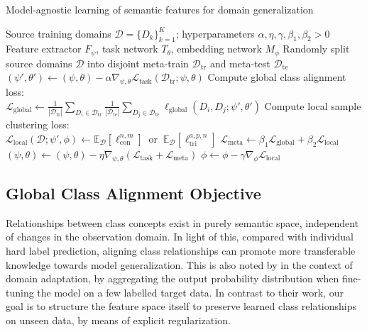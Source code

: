 \documentclass{article}
\newcommand{\Domains}{\mathcal{D}}
\newcommand{\TrainDomains}{\Domains_\mathrm{tr}}
\newcommand{\TestDomains}{\Domains_\mathrm{te}}
\newcommand{\TaskLoss}{\mathcal{L}_\mathrm{task}}
\newcommand{\LabelLoss}{\mathcal{L}_\mathrm{global}}
\newcommand{\LabelLossPair}{\ell_\mathrm{global}}
\newcommand{\MetricLoss}{\mathcal{L}_\mathrm{local}}
\newcommand{\MetaLoss}{\mathcal{L}_\mathrm{meta}}
\newcommand{\grad}[1][]{\nabla_{\!#1}}
\newcommand{\expec}{\mathbb{E}}
\begin{document}
\begin{algorithm}[t]
\caption{Model-agnostic learning of semantic features for domain generalization}
\begin{algorithmic}[1]
    \REQUIRE Source training domains $\Domains=\{D_k\}_{k=1}^K$; hyperparameters $\alpha, \eta, \gamma, \beta_1, \beta_2 > 0$
    \ENSURE Feature extractor $F_\psi$, task network $T_\theta$, embedding network $M_\phi$
    \REPEAT
        \STATE Randomly split source domains $\Domains$ into disjoint meta-train $\TrainDomains$ and meta-test $\TestDomains$
        \STATE $(\psi',\theta') \gets (\psi,\theta) - \alpha \grad[\psi,\theta] \TaskLoss(\TrainDomains; \psi,\theta)$
\STATE Compute global class alignment loss: \\
         $\LabelLoss \gets \frac{1}{|\TrainDomains|}\sum_{D_i\in\TrainDomains} \frac{1}{|\TestDomains|}\sum_{D_j\in\TestDomains} \LabelLossPair(D_i,D_j;\psi',\theta')$
\STATE Compute local sample clustering loss: \\
            $\MetricLoss(\Domains; \psi',\phi) \gets
            \expec_\Domains[\ell_\mathrm{con}^{n,m}] \;\;\text{or}\;\;
            \expec_\Domains[\ell_\mathrm{tri}^{a,p,n}]$
        \STATE $\MetaLoss \gets \beta_1 \LabelLoss + \beta_2 \MetricLoss$
        \STATE $(\psi,\theta) \gets (\psi,\theta) - \eta \grad[\psi,\theta] (\TaskLoss + \MetaLoss)$
        \STATE $\phi \gets \phi - \gamma \grad[\phi] \MetricLoss$
\end{algorithmic}
\label{alg}
\end{algorithm}


\subsection{Global Class Alignment Objective}\label{sec:global_loss}

Relationships between class concepts exist in purely semantic space, independent of changes in the observation domain. In light of this, compared with individual hard label prediction,
aligning class relationships can promote more transferable knowledge towards model generalization. This is also noted by \citet{tzeng2015simultaneous} in the context of domain adaptation, by aggregating the output probability distribution when fine-tuning the model on a few labelled target data. In contrast to their work, our goal is to structure the feature space itself to preserve learned class relationships on unseen data, by means of explicit regularization.
\end{document}
